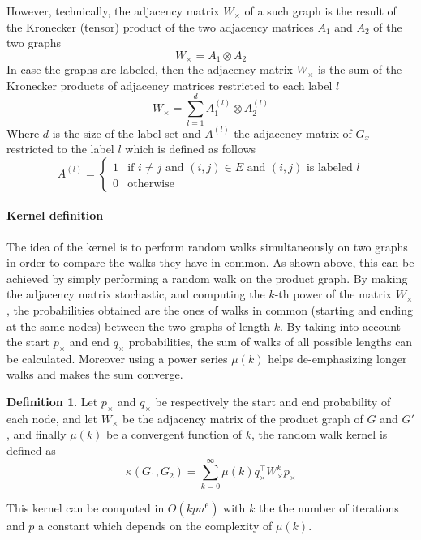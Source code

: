\documentclass{article}
\theoremstyle{definition}
\newtheorem{definition}{Definition}
\begin{document}
However, technically, the adjacency matrix $W_{\times}$ of a such graph is the result of the Kronecker (tensor) product of the two adjacency matrices $A_1$ and $A_2$ of the two graphs \cite{weichsel1962kronecker}
\begin{equation}
    W_{\times}=A_1 \otimes A_{2}
\end{equation}
In case the graphs are labeled, then the adjacency matrix $W_{\times}$ is the sum of the Kronecker products of adjacency matrices restricted to each label $l$ 
\begin{equation}
	W_{\times}=\sum\limits_{l=1}^{d} A_1^{(l)} \otimes A_2^{(l)}
\end{equation}
Where $d$ is the size of the label set and $A^{(l)}$ the adjacency matrix of $G_x$ restricted to the label $l$ which is defined as follows
\begin{equation}
	A^{(l)}=\left\{
		\begin{matrix}
		1 & \mbox{if } i \neq j \mbox{ and } (i,j) \in E \mbox{ and } (i,j) \mbox{ is labeled } l\\
		0 & \mbox{otherwise}
		\end{matrix}
		\right.
\end{equation}

\paragraph{Kernel definition}
The idea of the kernel is to perform random walks simultaneously on two graphs in order to compare the walks they have in common. As shown above, this can be achieved by simply performing a random walk on the product graph.
By making the adjacency matrix stochastic, and computing the $k$-th power of the matrix $W_\times$, the probabilities obtained are the ones of walks in common (starting and ending at the same nodes) between the two graphs of length $k$.
By taking into account the start $p_\times$ and end $q_\times$ probabilities, the sum of walks of all possible lengths can be calculated. Moreover using a power series $\mu(k)$ helps de-emphasizing longer walks and makes the sum converge. 
\begin{definition}Let $p_{\times}$ and $q_{\times}$ be respectively the start and end probability of each node, and let $W_{\times}$ be the adjacency matrix of the product graph of $G$ and $G'$, and finally $\mu(k)$ be a convergent function of $k$, the random walk kernel is defined as\cite{vishwanathan_graph_2010}
	\begin{equation}
		\kappa(G_1,G_2) = \sum\limits_{k=0}^{\infty}\mu(k)q_{\times}^{\top}W_{\times}^{k}p_{\times}
	\end{equation}
\end{definition}
\noindent
This kernel can be computed in $O(kpn^6)$ with $k$ the the number of iterations and $p$ a constant which depends on the complexity of $\mu(k)$.
\end{document}
